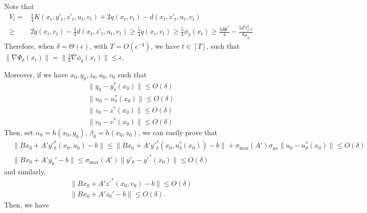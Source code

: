 \documentclass{article}
\theoremstyle{plain}
\theoremstyle{definition}
\theoremstyle{remark}
\begin{document}
Note that 
\begin{align*}
    V_t=&\frac{1}{4}K(x_t, y'_t, z'_t, u_t, v_t)+2q(x_t,v_t)-d(x_t,z'_t, u_t, v_t)\\
    \geq& 2q(x_t,v_t)-\frac{3}{4}d(x_t,z'_t, u_t, v_t)\geq \frac{5}{4}q(x_t,v_t)\geq \frac{5}{4}\phi_\delta(x_t)\geq \frac{5\delta\Phi^*}{4}-\frac{5\delta^2 l^2_{f,0}}{8\mu_g}
\end{align*}
Therefore, when $\delta=\Theta(\epsilon)$, with $T=O(\epsilon^{-4})$, we have $t\in[T]$, such that $\|\nabla \Phi_\delta(x_{t})\|=\|\frac{1}{\delta}\nabla \phi_\delta(x_{t})\|\leq \epsilon$.




Moreover, if we have $x_0, y_0, z_0, u_0, v_0$ such that
\begin{align*}
    \|y_0-y^*_\delta(x_0)\|\leq O(\delta)\\
    \|u_0-u^*_\delta(x_0)\|\leq O(\delta)\\
    \|z_0-z^*(x_0)\|\leq O(\delta)\\
    \|v_0-v^*(x_0)\|\leq O(\delta)
\end{align*}
Then, set $\alpha_0=h(x_0,y_0)$, $\beta_0=h(x_0,z_0)$, we can easily prove that
\begin{align*}
        &\|Bx_0+A'y'^*_\delta(x_0,u_0)-b\|\leq \|Bx_0+A'y'^*_\delta(x_0,u^*_\delta(x_0))-b\|+\sigma_{\max}(A')\sigma_{yu}\|u_0-u^*_\delta(x_0)\|\leq O(\delta)\\
        &\|Bx_0+A'y_0'-b\|\leq \sigma_{\max}(A')\|y'_0-y'^*(x_0)\|\leq O(\delta)
\end{align*}
and similarly, 
\begin{align*}
        \|Bx_0+A'z'^*(x_0,v_0)-b\|\leq O(\delta)\\
        \|Bx_0+A'z_0'-b\|\leq O(\delta).
\end{align*}
Then, we have
\end{document}
